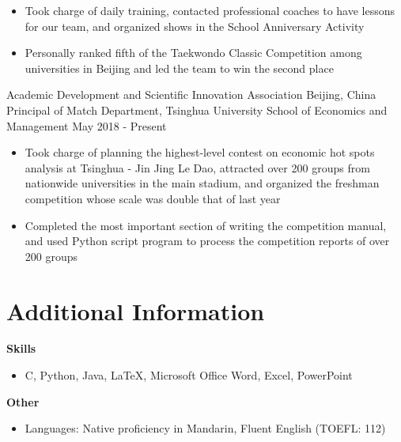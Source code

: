 \documentclass{resumeEN}
\begin{document}
    \begin{itemize}
        \item Took charge of daily training, contacted professional coaches to have lessons for our team, and organized shows in the School Anniversary Activity
        \item Personally ranked fifth of the Taekwondo Classic Competition among universities in Beijing and led the team to win the second place
    \end{itemize}


    \Experience
    {Academic Development and Scientific Innovation Association}
    {Beijing, China}
    {Principal of Match Department, Tsinghua University School of Economics and Management}
    {May 2018 - Present}

    \begin{itemize}
        \item Took charge of planning the highest-level contest on economic hot spots analysis at Tsinghua - Jin Jing Le Dao, attracted over 200 groups from nationwide universities in the main stadium, and organized the freshman competition whose scale was double that of last year
        \item Completed the most important section of writing the competition manual, and used Python script program to process the competition reports of over 200 groups
    \end{itemize}

    \section{Additional Information}
    \vspace{0.618ex}
    \textbf{Skills}
    \begin{itemize}
        \item C, Python, Java, {\LaTeX}, Microsoft Office Word, Excel, PowerPoint
    \end{itemize}
    \textbf{Other}
    \begin{itemize}
        \item Languages: Native proficiency in Mandarin, Fluent English (TOEFL: 112)
    \end{itemize}
\end{document}
